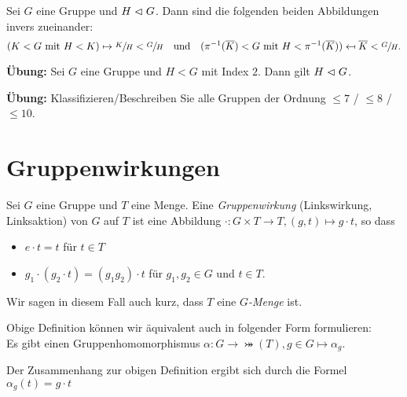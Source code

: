 \begin{corollary}
	Sei $G$ eine Gruppe und $H \vartriangleleft G$.
	Dann sind die folgenden beiden Abbildungen invers zueinander:
	\[
		(K < G \text{ mit } H < K) \mapsto  \sfrac{K}{H} < \sfrac{G}{H} \qq{und}(\pi^{-1}(\overline{K}) < G \text{ mit } H < \pi^{-1}(\overline{K})) \mapsfrom \overline{K} < \sfrac{G}{H}
	.\] 
\end{corollary}


\textbf{Übung:}
Sei $G$ eine Gruppe und $H < G$ mit Index $2$.
Dann gilt $H \vartriangleleft G$.

\textbf{Übung:} Klassifizieren/Beschreiben Sie alle Gruppen der Ordnung $\leq 7$ / $\leq 8$ / $\leq 10$.

\section{Gruppenwirkungen}

\begin{definition}
	Sei $G$ eine Gruppe und $T$ eine Menge.
	Eine \emph{Gruppenwirkung} (Linkswirkung, Linksaktion) von $G$ auf $T$ ist eine Abbildung $\cdot: G \times T \to T, (g,t) \mapsto g \cdot t$, so dass
	\begin{itemize}
		\item $e\cdot t = t$ für $t \in T$ 
		\item $g_1 \cdot (g_2 \cdot t) = (g_1 g_2) \cdot t$ für $g_1,g_2 \in G$ und $t \in T$.
	\end{itemize}
	Wir sagen in diesem Fall auch kurz, dass $T$ eine \emph{$G$-Menge} ist.
\end{definition}

\begin{remark}
	Obige Definition können wir äquivalent auch in folgender Form formulieren:\\
	Es gibt einen Gruppenhomomorphismus $\alpha: G \to \bij(T), g \in G \mapsto \alpha_{g}$.

	Der Zusammenhang zur obigen Definition ergibt sich durch die Formel $\alpha_{g}(t) = g \cdot t$
\end{remark}


